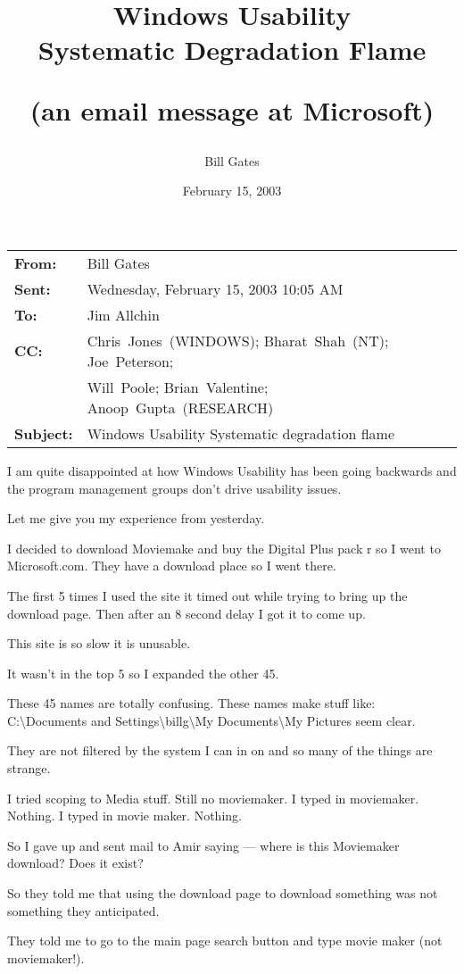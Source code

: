\documentclass[12pt,letterpaper]{article}
\title{Windows Usability\\
Systematic Degradation Flame\\
\strut \normalsize (an email message at Microsoft)}
\author{Bill Gates}
\date{February 15, 2003}
\begin{document}
\maketitle

\begin{tabular}{@{}>{\bfseries}l@{\,}l}
From:&Bill Gates\\
Sent:&Wednesday, February 15, 2003 10:05 AM\\
To:&Jim Allchin\\
CC:&Chris~Jones~(WINDOWS); Bharat~Shah~(NT); Joe~Peterson;\\
&Will~Poole; Brian~Valentine; Anoop~Gupta~(RESEARCH)\\
Subject:&Windows Usability Systematic degradation flame
\end{tabular}

I am quite disappointed at how Windows Usability has been going backwards and
the program management groups don't drive usability issues.

Let me give you my experience from yesterday.

I decided to download Moviemake and buy the Digital Plus pack r so I went to Microsoft.com.
They have a download place so I went there.

The first 5 times I used the site it timed out while trying to bring up the download page.
Then after an 8 second delay I got it to come up.

This site is so slow it is unusable.

It wasn't in the top 5 so I expanded the other 45.

These 45 names are totally confusing.
These names make stuff like:\\
C:\textbackslash{}Documents and Settings\textbackslash{}billg\textbackslash{}My
Documents\textbackslash{}My Pictures seem clear.

They are not filtered by the system I can in on and so many of the things are
strange.

I tried scoping to Media stuff.
Still no moviemaker.
I typed in moviemaker. Nothing.
I typed in movie maker. Nothing.

So I gave up and sent mail to Amir saying --- where is this Moviemaker
download? Does it exist?

So they told me that using the download page to download something was not
something they anticipated.

They told me to go to the main page search button and type movie maker (not
moviemaker!).
\end{document}
